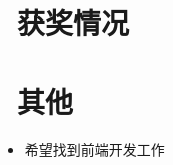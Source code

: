 \documentclass{resume}
\begin{document}
\section{\faHeartO\ 获奖情况}

\section{\faInfo\ 其他}
\begin{itemize}[parsep=0.5ex]
  \item 希望找到前端开发工作
\end{itemize}

%
%
\end{document}

